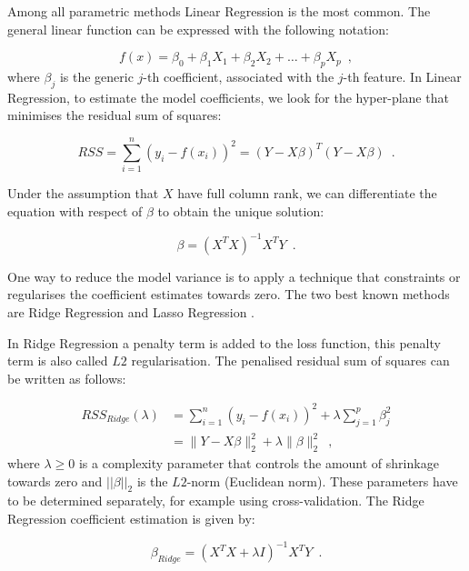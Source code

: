 Among all parametric methods Linear Regression is the most common. The general linear function can be expressed with the following notation:

\begin{equation} \label{eq:linear_function}
    f(x)=\beta_0 + \beta_1X_1 + \beta_2X_2 + \ldots + \beta_pX_p
    \enspace,
\end{equation}
where $\beta_j$ is the generic $j$-th coefficient, associated with the $j$-th feature.
In Linear Regression, to estimate the model coefficients, we look for the hyper-plane that minimises the residual sum of squares:

\begin{equation}
    RSS = \sum_{i=1}^{n}(y_i -f(x_i))^2 = (Y - X\beta)^T(Y - X\beta)
    \enspace.
\end{equation}

Under the assumption that $X$ have full column rank, we can differentiate the equation with respect of $\beta$ to obtain the unique solution:

\begin{equation}
    \beta = (X^TX)^{-1}X^TY
    \enspace.
\end{equation}

One way to reduce the model variance is to apply a technique that constraints or regularises the coefficient estimates towards zero. The two best known methods are Ridge Regression \citep{hoerl1970ridge} and Lasso Regression \citep{tibshirani1996regression}. 

In Ridge Regression a penalty term is added to the loss function, this penalty term is also called $L2$ regularisation. The penalised residual sum of squares can be written as follows:

\begin{equation}
\begin{aligned}
 RSS_{Ridge}(\lambda) & = \sum_{i=1}^{n}(y_i -f(x_i))^2 + \lambda\sum_{j=1}^{p}\beta^{2}_{j} \\
& = \|Y - X\beta\|_2^2 + \lambda\|\beta\|_2^2
    \enspace,
\end{aligned}
\end{equation}
where $ \lambda \geq 0 $ is a complexity parameter that controls the amount of shrinkage towards zero and $||\beta||_2$ is the $L2$-norm (Euclidean norm). These parameters have to be determined separately, for example using cross-validation. The Ridge Regression coefficient estimation is given by:

\begin{equation}
    \beta_{Ridge} = (X^TX + \lambda I)^{-1}X^TY
    \enspace.
\end{equation}


